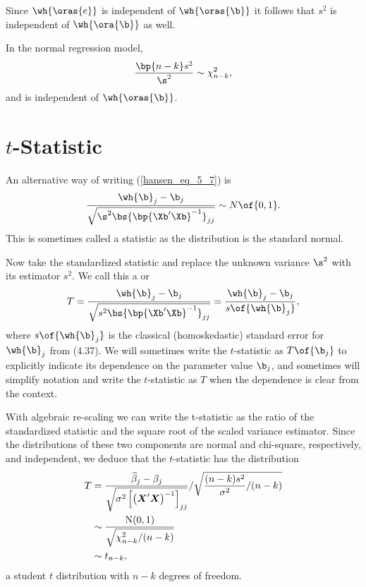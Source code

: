 Since $\wh{\oras{e}}$ is independent of $\wh{\oras{\b}}$ it follows that $s^2$ is independent of $\wh{\ora{\b}}$ as well. 
\begin{theorem}
    \label{hansen_thm_5_7}
    In the normal regression model, 
    \begin{equation}
        \notag
        \frac{\bp{n-k} s^2}{\s^2} \sim \chi_{n-k}^2 ,
    \end{equation}
    and is independent of $\wh{\oras{\b}}$.
\end{theorem}

\section{$t$-Statistic}

An alternative way of writing (\ref{hansen_eq_5_7}) is 
\begin{equation}
    \notag
    \frac{\wh{\b}_j - \b_j}{\sqrt{ \s^2 \bs{\bp{\Xb^\prime \Xb}^{-1}}_{jj}}} \sim N\of{0,1}.
\end{equation}
This is sometimes called a  statistic as the distribution is the standard normal.

Now take the standardized statistic and replace the unknown variance $\s^2$ with its estimator $s^2$. We call this a  or 
\begin{equation}
    \notag
    T = \frac{\wh{\b}_j - \b_j}{\sqrt{ s^2 \bs{\bp{\Xb^\prime \Xb}^{-1}}_{jj}}} = \frac{\wh{\b}_j - \b_j}{s\of{\wh{\b}_j}}, 
\end{equation}
where $s\of{\wh{\b}_j}$ is the classical (homoskedastic) standard error for $\wh{\b}_j$ from (4.37). We will sometimes write the $t$-statistic as $T\of{\b_j}$ to explicitly indicate its dependence on the parameter value $\b_j$, and sometimes will simplify notation and write the $t$-statistic as $T$ when the dependence is clear from the context.

With algebraic re-scaling we can write the t-statistic as the ratio of the standardized statistic and the square root of the scaled variance estimator. Since the distributions of these two components are normal and chi-square, respectively, and independent, we deduce that the $t$-statistic has the distribution
\begin{equation}
    \notag
    \begin{aligned}
        T & =\frac{\widehat{\beta}_j-\beta_j}{\sqrt{\sigma^2\left[\left(\boldsymbol{X}^{\prime} \boldsymbol{X}\right)^{-1}\right]_{j j}}} / \sqrt{\frac{(n-k) s^2}{\sigma^2} /(n-k)} \\
        & \sim \frac{\mathrm{N}(0,1)}{\sqrt{\chi_{n-k}^2 /(n-k)}} \\
        & \sim t_{n-k},
    \end{aligned}
\end{equation}
a student $t$ distribution with $n - k$ degrees of freedom.

